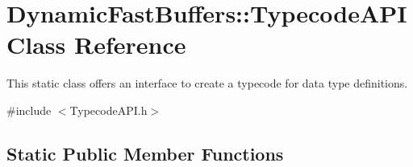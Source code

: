 \hypertarget{class_dynamic_fast_buffers_1_1_typecode_a_p_i}{\section{Dynamic\-Fast\-Buffers\-:\-:Typecode\-A\-P\-I Class Reference}
\label{class_dynamic_fast_buffers_1_1_typecode_a_p_i}
}


This static class offers an interface to create a typecode for data type definitions.  




{\ttfamily \#include $<$Typecode\-A\-P\-I.\-h$>$}

\subsection*{Static Public Member Functions}
